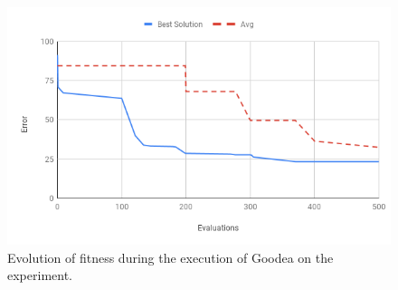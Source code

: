 \begin{figure}[h!]
		\centering
    	\includegraphics[width=\linewidth]{assets/images/experiment-fitness-evolution.png}
    	\caption{Evolution of fitness during the execution of Goodea on the experiment.}
    	\label{fig:fitness-experiment-evolution}
\end{figure}

